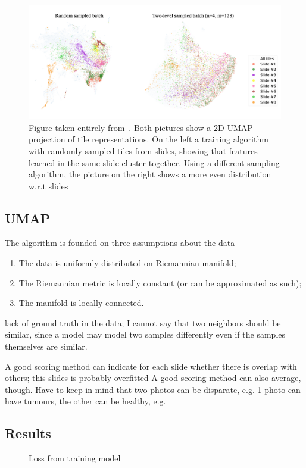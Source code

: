 \documentclass[10pt,twocolumn,letterpaper]{article}
\begin{document}
\begin{figure}
  \includegraphics[scale=.17]{./umap.png}
  \caption{Figure taken entirely from~\cite{sslUMAP}. Both pictures show a 2D \gls{UMAP} projection of tile representations. On the left a training algorithm with randomly sampled tiles from slides, showing that features learned in the same slide cluster together. Using a different sampling algorithm, the picture on the right shows a more even distribution w.r.t slides}
  \label{fig:umap}
\end{figure}

\subsection{UMAP}
 The algorithm is founded on three assumptions about the data
 \begin{enumerate}
   \item The data is uniformly distributed on Riemannian manifold;
   \item The Riemannian metric is locally constant (or can be approximated as such);
   \item The manifold is locally connected.
 \end{enumerate}

lack of ground truth in the data; I cannot say that two neighbors should be similar, since a model may model two samples differently even if the samples themselves are similar.

A good scoring method can indicate for each slide whether there is overlap with others; this slides is probably overfitted
A good scoring method can also average, though.
Have to keep in mind that two photos can be disparate, e.g. 1 photo can have tumours, the other can be healthy, e.g.

\subsection{Results}\label{sec:results}
\begin{figure}\label{fig:loss}
\caption{Loss from training model}
\end{figure}
\end{document}

